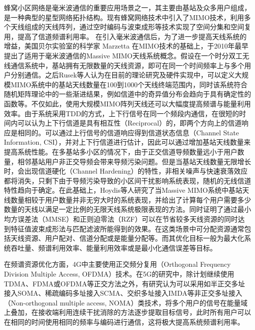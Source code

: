 蜂窝小区网络是毫米波通信的重要应用场景之一，其主要由基站及众多用户组成，是一种典型的星型网络拓扑结构。现有蜂窝网络技术中引入了MIMO技术，利用多个天线组成的天线阵列，通过空时编码与波束成形等技术实现了空间分集和空间复用，提高了信道频谱利用率。
在引入毫米波通信后，为了进一步提高天线系统的增益，美国贝尔实验室的科学家 Marzetta 在MIMO技术的基础上，于2010年最早提出了适用于毫米波通信的Massive MIMO天线系统概念\cite{marzetta2010noncooperative}。假设在一个时分双工无线通信系统中，基站拥有无限数量的天线资源，即可在同一个时间频率上与多个用户分别通信。之后Rusek等人认为在目前的理论研究及硬件实现中，可以定义大规模MIMO系统中的基站天线数量在100到1000个天线终端范围内\cite{rusek2013scaling}，同时该系统符合随机矩阵理论中的一些渐进结果，例如信道中的奇异值分布会趋向于具有确定性的函数等。不仅如此，使用大规模MIMO阵列天线还可以大幅度提高频谱与能量利用效率\cite{lu2014overview}。由于系统采用TDD的方式，上下行信号在同一个频段内通信，在很短的时间内可以认为上下行信道是具有相互性（Reciprocal）\cite{bjornson2016massive}的，即两个方向上的信道响应是相同的。可以通过上行信号的信道响应得到信道状态信息（Channel State Information, CSI），并对上下行信道进行估计，因此可以通过增加基站天线数量来提高系统性能\cite{marzetta2006much}。在多基站多小区的情况下，由于正交信道导频数量远小于用户数量\cite{marzetta1999blast}，相邻基站用户非正交导频会带来导频污染问题。但是当基站天线数量无限增长时，会出现信道硬化（Channel Hardening）\cite{hochwald2002space,hochwald2004multiple}的特性，非相关噪声与快速衰落效应都将消失，只剩下由于导频污染导致的小区间干扰影响系统表现，随机的无线信道特性趋向于确定\cite{wangxinshui}。在此基础上，Hoydis等人\cite{hoydis2013massive}研究了当Massive MIMO系统中基站天线数量相较于用户数量并非无穷大时的系统表现，并给出了计算每个用户需要多少数量的天线以满足一定比例的无限天线系统极限表现的方法。同时证明了通过最小均方误差法（MMSE）和正则迫零法（RZF）可以在节省较多天线资源的同时达到特征值波束成形法与匹配滤波所能得到的效果。在这类场景中可分配资源通常包括天线资源、用户配对、信道分配或是能量分配等。而其优化目标一般为最大化系统吞吐量、频谱利用效率、能量利用效率或是最小化通信误差等目标。

在频谱资源优化方面，4G中主要使用正交频分复用（Orthogonal Frequency Division Multiple Access, OFDMA）技术\cite{holma2009lte}。在5G的研究中，除计划继续使用TDMA、FDMA或OFDMA等正交方法之外，有研究认为可以采用如半正交多址接入SOMA\cite{khormuji2015generalized}、稀疏编码多址接入SCMA\cite{nikopour2013sparse}、交织多址接入IMDA\cite{ping2006interleave}等非正交多址接入（Non-orthogonal multiple access, NOMA）类技术\cite{saito2013non,dai2015non}，将多个用户的信号在能量域上叠加，在接收端利用连续干扰消除的方法逐步提取目标信号，此时所有用户可以在相同的时间使用相同的频率与编码进行通信，这将极大提高系统频谱利用率。


